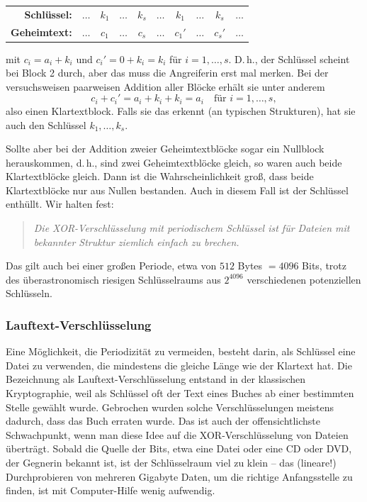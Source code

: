 \begin{refsegment}
\begin{center}
\begin{tabular}{rc|ccc|c|ccc|c}
   {\bf Schlüssel:}  & $\ldots$ & $k_1$ & $\ldots$ & $k_s$     & $\ldots$ & $k_1$  & $\ldots$ & $k_s$    & $\ldots$ \\
   {\bf Geheimtext:} & $\ldots$ & $c_1$ & $\ldots$ & $c_s$     & $\ldots$ & $c_1'$ & $\ldots$ & $c_s'$   & $\ldots$
\end{tabular}
\end{center}
mit $c_i = a_i + k_i$ und $c_i' = 0 + k_i = k_i$ für $i = 1, \ldots, s$.
D.\,h., der Schlüssel scheint bei Block 2 durch, aber das muss die Angreiferin
erst mal merken. Bei der versuchsweisen paarweisen Addition aller Blöcke
erhält sie unter anderem
\[
     c_i + c_i' = a_i + k_i + k_i = a_i \quad\text{für } i = 1, \ldots, s,
\]
also einen Klartextblock. Falls sie das erkennt (an typischen Strukturen),
hat sie auch den Schlüssel $k_1, \ldots, k_s$.

Sollte aber bei der Addition zweier Geheimtextblöcke sogar ein Nullblock herauskommen,
d.\,h., sind zwei Geheimtextblöcke gleich, so waren auch beide Klartextblöcke
gleich. Dann ist die Wahrscheinlichkeit groß, dass beide Klartextblöcke
nur aus Nullen bestanden. Auch in diesem Fall ist der Schlüssel enthüllt.
Wir halten fest:
\begin{quote}
   {\em Die XOR-Verschlüsselung mit periodischem Schlüssel ist für
   Dateien mit bekannter Struktur ziemlich einfach zu brechen.}
\end{quote}
Das gilt auch bei einer großen Periode, etwa von $512$ Bytes $= 4096$ Bits,
trotz des überastronomisch riesigen Schlüsselraums aus $2^{4096}$ verschiedenen
potenziellen Schlüsseln.


\subsubsection*{Lauftext-Verschlüsselung}

Eine Möglichkeit, die Periodizität zu vermeiden, besteht darin, als Schlüssel
eine Datei zu verwenden, die mindestens die gleiche Länge wie der Klartext hat.
Die Bezeichnung als Lauftext-Verschlüsselung
entstand in der klassischen Kryptographie, weil als Schlüssel oft der Text eines Buches ab
einer bestimmten Stelle gewählt wurde. Gebrochen wurden solche Verschlüsselungen
meistens dadurch, dass das Buch erraten wurde. Das ist auch der
offensichtlichste Schwachpunkt, wenn man diese Idee auf die XOR-Verschlüsselung
von Dateien überträgt. Sobald die Quelle der Bits, etwa eine Datei oder eine
CD oder DVD, der Gegnerin bekannt ist, ist der Schlüsselraum viel zu klein --
das (lineare!) Durchprobieren von mehreren Gigabyte Daten, um die richtige
Anfangsstelle zu finden, ist mit Computer-Hilfe wenig aufwendig.


\end{refsegment}

